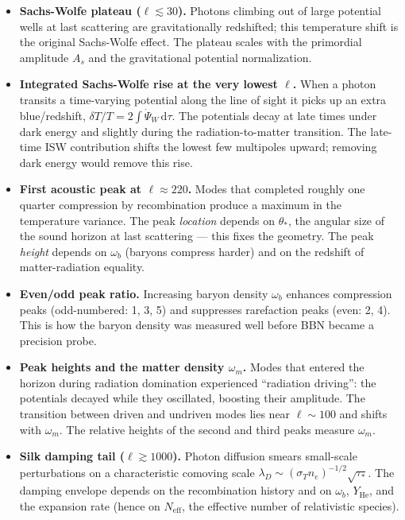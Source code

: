 \begin{itemize}[leftmargin=*]
  \item \textbf{Sachs-Wolfe plateau ($\ell \lesssim 30$).}
    Photons climbing out of large potential wells at last scattering are gravitationally redshifted; this temperature shift is the original Sachs-Wolfe effect. The plateau scales with the primordial amplitude $A_s$ and the gravitational potential normalization.

  \item \textbf{Integrated Sachs-Wolfe rise at the very lowest $\ell$.}
    When a photon transits a time-varying potential along the line of sight it picks up an extra blue/redshift, $\delta T/T = 2\int\dot\Psi_W\,\mathrm{d}\tau$. The potentials decay at late times under dark energy and slightly during the radiation-to-matter transition. The late-time ISW contribution shifts the lowest few multipoles upward; removing dark energy would remove this rise.

  \item \textbf{First acoustic peak at $\ell \approx 220$.}
    Modes that completed roughly one quarter compression by recombination produce a maximum in the temperature variance. The peak \emph{location} depends on $\theta_*$, the angular size of the sound horizon at last scattering — this fixes the geometry. The peak \emph{height} depends on $\omega_b$ (baryons compress harder) and on the redshift of matter-radiation equality.

  \item \textbf{Even/odd peak ratio.}
    Increasing baryon density $\omega_b$ enhances compression peaks (odd-numbered: 1, 3, 5) and suppresses rarefaction peaks (even: 2, 4). This is how the baryon density was measured well before BBN became a precision probe.

  \item \textbf{Peak heights and the matter density $\omega_m$.}
    Modes that entered the horizon during radiation domination experienced ``radiation driving'': the potentials decayed while they oscillated, boosting their amplitude. The transition between driven and undriven modes lies near $\ell \sim 100$ and shifts with $\omega_m$. The relative heights of the second and third peaks measure $\omega_m$.

  \item \textbf{Silk damping tail ($\ell \gtrsim 1000$).}
    Photon diffusion smears small-scale perturbations on a characteristic comoving scale $\lambda_D \sim (\sigma_T n_e)^{-1/2}\sqrt{\tau_*}$. The damping envelope depends on the recombination history and on $\omega_b$, $Y_\mathrm{He}$, and the expansion rate (hence on $N_\mathrm{eff}$, the effective number of relativistic species).


\end{itemize}
